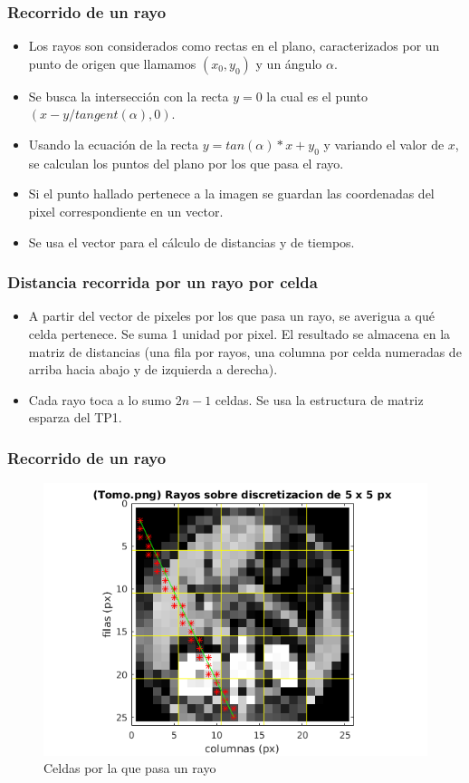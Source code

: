 \documentclass[11pt]{beamer}
\begin{document}
\begin{frame}
\frametitle{Recorrido de un rayo}
\begin{itemize}
\item Los rayos son considerados como rectas en el plano, caracterizados por un punto de origen que llamamos $(x_{0},y_{0})$ y un ángulo $\alpha$.
\item Se busca la intersección con la recta $y=0$ la cual es el punto $(x-y/tangent(\alpha),0)$.
\item Usando la ecuación de la recta $y=tan(\alpha)*x+y_{0}$ y variando el valor de $x$, se calculan los puntos del plano por los que pasa el rayo.
\item Si el punto hallado pertenece a la imagen se guardan las coordenadas del pixel correspondiente en un vector.
\item Se usa el vector para el cálculo de distancias y de tiempos.
\end{itemize}
\end{frame}

\begin{frame}
\frametitle{Distancia recorrida por un rayo por celda}
\begin{itemize}
\item A partir del vector de pixeles por los que pasa un rayo, se averigua a qué celda pertenece. Se suma 1 unidad por pixel. El resultado se almacena en la matriz de distancias (una fila por rayos, una columna por celda numeradas de arriba hacia abajo y de izquierda a derecha).
\item Cada rayo toca a lo sumo $2n-1$ celdas. Se usa la estructura de matriz esparza del TP1.
\end{itemize}
\end{frame}


\begin{frame}
\frametitle{Recorrido de un rayo}
\begin{figure}[H]
    \centering
    \includegraphics[scale=0.5]{img/recorridorayo.png}
    \caption{Celdas por la que pasa un rayo}
    \label{fig:recorridorayo}
\end{figure}
\end{frame}
\end{document}
